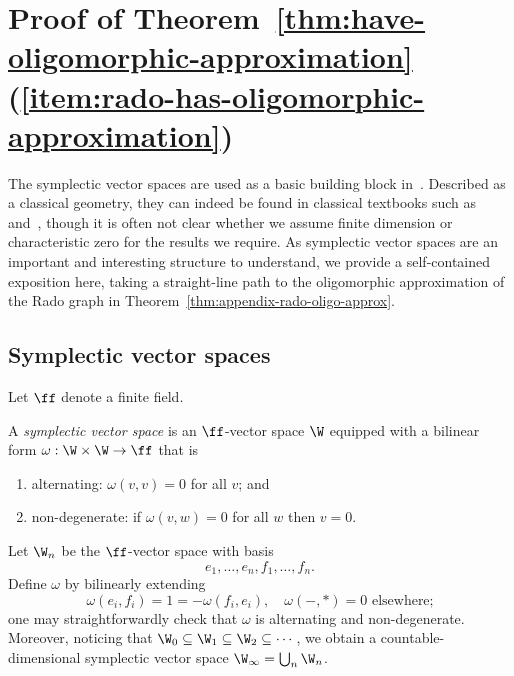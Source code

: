 
\section{Proof of Theorem~\ref{thm:have-oligomorphic-approximation}(\ref{item:rado-has-oligomorphic-approximation})}\label{sec:appendix-symplectic}

The symplectic vector spaces are used as a basic building block in~\cite{KLM89}.
Described as a classical geometry, they can indeed be found in classical textbooks such as~\cite[pp.~114--121]{Artin_symplectic} and~\cite[pp.~75--83]{Aschbacher_symplectic},
though it is often not clear whether we assume finite dimension or characteristic zero for the results we require. 
As symplectic vector spaces are an important and interesting structure to understand, we provide a self-contained exposition here, taking a straight-line path to the oligomorphic approximation of the Rado graph in Theorem~\ref{thm:appendix-rado-oligo-approx}.

\subsection{Symplectic vector spaces}
Let $\ff$ denote a finite field.
\begin{definition}
    A \emph{symplectic vector space} is an $\ff$-vector space $\W$ 
    equipped with a bilinear form $\omega: \W \times \W \to \ff$ that is
    \begin{enumerate}
        \item alternating: $\omega(v, v) = 0$ for all $v$; and
        \item non-degenerate: if $\omega(v, w) = 0$ for all $w$ then $v = 0$.
    \end{enumerate}
\end{definition}

\begin{example}
    Let $\W_n$ be the $\ff$-vector space with basis \[e_1  , \ldots, e_n, f_1, \ldots, f_n.\]
    Define $\omega$ by bilinearly extending
    \begin{equation}\label{eq:symplectic-basis}
        \omega(e_i, f_i) = 1 = -\omega(f_i, e_i),\quad
        \omega(-, *) = 0 \text{ elsewhere;}
        \tag{$\ddagger$}
    \end{equation}
    one may straightforwardly check that $\omega$ is alternating and non-degenerate.
    Moreover, noticing that $\W_0 \subseteq \W_1 \subseteq \W_2 \subseteq \cdots$,
    we obtain a countable-dimensional symplectic vector space $\W_\infty = \bigcup_n \W_n$.
\lipicsEnd\end{example}

